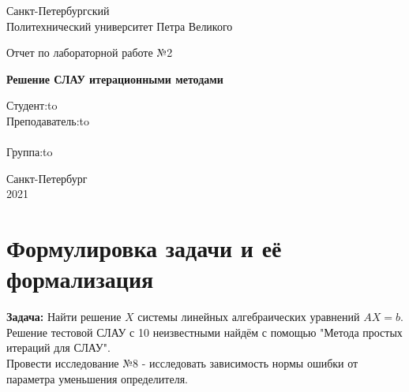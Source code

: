 \documentclass[12pt]{article}
\begin{document}
\begin{titlepage}
\Large

\begin{center}
Санкт-Петербургский \\ Политехнический университет Петра Великого

\vspace{10em}

Отчет по лабораторной работе №2\\

\vspace{2em}

\textbf{Решение СЛАУ итерационными методами}
\end{center}

\vspace{6em}

\newbox{\lbox}
\newlength{\maxl}
\setlength{\maxl}{\wd\lbox}
\hfill\parbox{14cm}{
\hspace*{5cm}\hspace*{-5cm}Студент:\hfill\hbox to\\
\hspace*{5cm}\hspace*{-5cm}Преподаватель:\hfill\hbox to\\
\\
\hspace*{5cm}\hspace*{-5cm}Группа:\hfill\hbox to\\}

\vspace{\fill}
\begin{center}
Санкт-Петербург \\2021
\end{center}
\end{titlepage}

\section{Формулировка задачи и её формализация}
\textbf{Задача:}
Найти решение $X$ системы линейных алгебраических уравнений $AX = b$.\\
Решение тестовой СЛАУ с 10 неизвестными найдём с помощью "Метода простых итераций для СЛАУ".\\
Провести исследование №8 - исследовать зависимость нормы ошибки от параметра уменьшения определителя.\\
\end{document}
